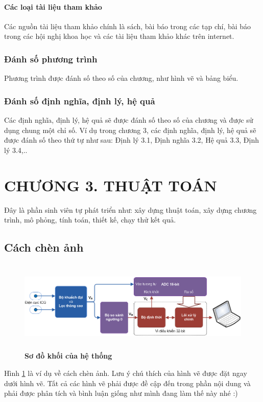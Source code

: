 \documentclass{article} %
\begin{document}
\paragraph{Các loại tài liệu tham khảo}\mbox{}

Các nguồn tài liệu tham khảo chính là sách, bài báo trong các tạp chí, bài báo trong các hội nghị khoa học và các tài liệu tham khảo khác trên internet.

\subsubsection{Đánh số phương trình}
Phương trình được đánh số theo số của chương, như hình vẽ và bảng biểu.
\subsubsection{Đánh số định nghĩa, định lý, hệ quả}
Các định nghĩa, định lý, hệ quả sẽ được đánh số theo số của chương và được sử dụng chung một chỉ số. Ví dụ trong chương 3, các định nghĩa, định lý, hệ quả sẽ được đánh số theo thứ tự như sau: Định lý 3.1, Định nghĩa 3.2, Hệ quả 3.3, Định lý 3.4,..

\newpage
\section*{CHƯƠNG 3. THUẬT TOÁN}
\setcounter{section}{3}
\setcounter{subsection}{0}
\setcounter{figure}{0}
\setcounter{table}{0}
Đây là phần sinh viên tự phát triển như: xây dựng thuật toán, xây dựng chương trình, mô phỏng, tính toán, thiết kế, chạy thử kết quả.
\subsection{Cách chèn ảnh}
\begin{figure}[!ht]
    \centering
    \includegraphics[width=16cm,height=4.39cm]{Images/hinh31.png}
    \caption[Sơ đồ khối của hệ thống]{\bfseries \fontsize{12pt}{0pt}\selectfont Sơ đồ khối của hệ thống}
    \label{hinh31}
\end{figure}
Hình \ref{hinh31} là ví dụ về cách chèn ảnh. Lưu ý chú thích của hình vẽ được đặt ngay dưới hình vẽ. Tất cả các hình vẽ phải được đề cập đến trong phần nội dung và phải được phân tích và bình luận giống như mình đang làm thế này nhé :)
\end{document}
